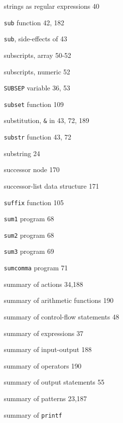 \begin{multicols}{3}
\hangindent=3pc  strings as regular expressions 40

\hangindent=3pc  \verb'sub' function 42, 182

\hangindent=3pc  \verb'sub', side-effects of 43

\hangindent=3pc  subscripts, array 50-52

\hangindent=3pc  subscripts, numeric 52

\hangindent=3pc  \verb'SUBSEP' variable 36, 53

\hangindent=3pc  \verb'subset' function 109

\hangindent=3pc  substitution, \verb'&' in 43, 72, 189

\hangindent=3pc  \verb'substr' function 43, 72

\hangindent=3pc  substring 24

\hangindent=3pc  successor node 170

\hangindent=3pc  successor-list data structure 171

\hangindent=3pc  \verb'suffix' function 105







\hangindent=3pc  \verb'sum1' program 68

\hangindent=3pc  \verb'sum2' program 68

\hangindent=3pc  \verb'sum3' program 69

\hangindent=3pc  \verb'sumcomma' program 71

\hangindent=3pc  summary of actions 34,188

\hangindent=3pc  summary of arithmetic functions 190

\hangindent=3pc  summary of control-flow statements 48

\hangindent=3pc  summary of expressions 37

\hangindent=3pc  summary of input-output 188

\hangindent=3pc  summary of operators 190

\hangindent=3pc  summary of output statements 55

\hangindent=3pc  summary of patterns 23,187

\hangindent=3pc  summary of \verb'printf'


\end{multicols}
